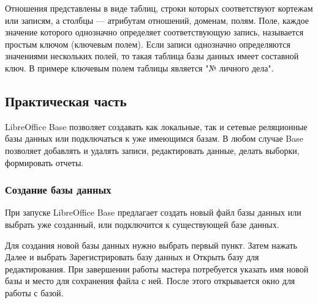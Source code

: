 \documentclass[a4paper]{article}
\begin{document}
Отношения представлены в виде таблиц, строки которых соответствуют кортежам или записям, а столбцы --- атрибутам отношений, доменам, полям. Поле, каждое значение которого однозначно определяет соответствующую запись, называется простым ключом (ключевым полем). Если записи однозначно определяются значениями нескольких полей, то такая таблица базы данных имеет составной ключ. В примере ключевым полем таблицы является "№ личного дела".

\subsection{Практическая часть}

LibreOffice Base позволяет создавать как локальные, так и сетевые реляционные базы данных или подключаться к уже имеющимся базам. В любом случае Base позволяет добавлять и удалять записи, редактировать данные, делать выборки, формировать отчеты.

\subsubsection{Создание базы данных}
При запуске LibreOffice Base предлагает создать новый файл базы данных или выбрать уже созданный, или подключится к существующей базе данных.

Для создания новой базы данных нужно выбрать первый пункт. Затем нажать Далее и выбрать Зарегистрировать базу данных и Открыть базу для редактирования. При завершении работы мастера потребуется указать имя новой базы и место для сохранения файла с ней. После этого открывается окно для работы с базой.

\begin{figure}[h]
\end{figure}
\end{document}
